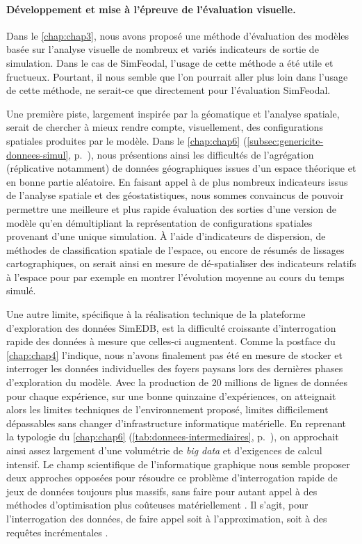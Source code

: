 \paragraph{Développement et mise à l'épreuve de l'évaluation visuelle.}

Dans le \cref{chap:chap3}, nous avons proposé une méthode d'évaluation des modèles basée sur l'analyse visuelle de nombreux et variés indicateurs de sortie de simulation.
Dans le cas de SimFeodal, l'usage de cette méthode a été utile et fructueux.
Pourtant, il nous semble que l'on pourrait aller plus loin dans l'usage de cette méthode, ne serait-ce que directement pour l'évaluation SimFeodal.

Une première piste, largement inspirée par la géomatique et l'analyse spatiale, serait de chercher à mieux rendre compte, visuellement, des configurations spatiales produites par le modèle.
Dans le \cref{chap:chap6} (\cref{subsec:genericite-donnees-simul}, p.~\pageref{par:specificites-donnees-simul}), nous présentions ainsi les difficultés de l'agrégation (réplicative notamment) de données géographiques issues d'un espace théorique et en bonne partie aléatoire.
En faisant appel à de plus nombreux indicateurs issus de l'analyse spatiale et des géostatistiques, nous sommes convaincus de pouvoir permettre une meilleure et plus rapide évaluation des sorties d'une version de modèle qu'en démultipliant la représentation de configurations spatiales provenant d'une unique simulation.
À l'aide d'indicateurs de dispersion, de méthodes de classification spatiale de l'espace, ou encore de résumés de lissages cartographiques, on serait ainsi en mesure de \og{}dé-spatialiser\fg{} des indicateurs relatifs à l'espace pour par exemple en montrer l'évolution moyenne au cours du temps simulé.

Une autre limite, spécifique à la réalisation technique de la plateforme d'exploration des données SimEDB, est la difficulté croissante d'interrogation rapide des données à mesure que celles-ci augmentent.
Comme la postface du \cref{chap:chap4} l'indique, nous n'avons finalement pas été en mesure de stocker et interroger les données individuelles des foyers paysans lors des dernières phases d'exploration du modèle.
Avec la production de 20 millions de lignes de données pour chaque expérience, sur une bonne quinzaine d'expériences, on atteignait alors les limites techniques de l'environnement proposé, limites difficilement dépassables sans changer d'infrastructure informatique matérielle.
En reprenant la typologie du \cref{chap:chap6} (\cref{tab:donnees-intermediaires}, p.~\pageref{tab:donnees-intermediaires}), on approchait ainsi assez largement d'une volumétrie de \textit{big data} et d'exigences de calcul intensif.
Le champ scientifique de l'informatique graphique nous semble proposer deux approches opposées pour résoudre ce problème d'interrogation rapide de jeux de données toujours plus massifs, sans faire pour autant appel à des méthodes d'optimisation plus coûteuses matériellement \autocite{amirpour_amraii_human-data_2018}.
Il s'agit, pour l'interrogation des données, de faire appel soit à l'approximation, soit à des requêtes incrémentales \autocite[28--33]{amirpour_amraii_human-data_2018}.

